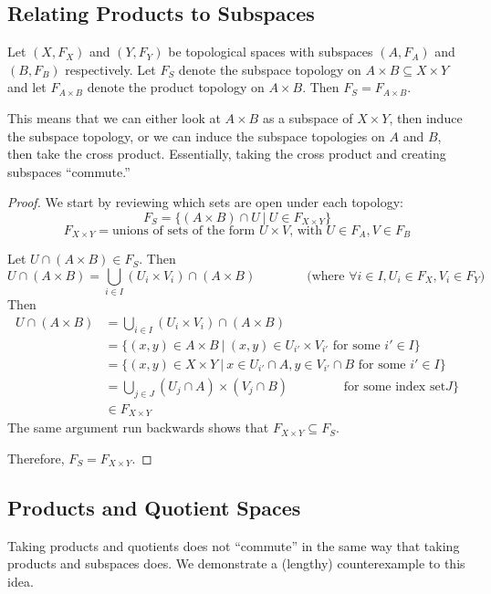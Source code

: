 \subsection{Relating Products to Subspaces}
\begin{smallfact}
Let $(X, F_X)$ and $(Y, F_Y)$ be topological spaces with subspaces $(A, F_A)$ and $(B, F_B)$ respectively.  Let $F_S$ denote the subspace topology on $A\times B\subseteq X\times Y$ and let $F_{A\times B}$ denote the product topology on $A\times B$.  Then $F_S = F_{A\times B}$.
\end{smallfact}
This means that we can either look at $A\times B$ as a subspace of $X\times Y$, then induce the subspace topology, or we can induce the subspace topologies on $A$ and $B$, then take the cross product.  Essentially, taking the cross product and creating subspaces ``commute.''
\begin{proof}
We start by reviewing which sets are open under each topology:
\[ F_S = \{  (A\times B)\cap U\ |\ U\in F_{X\times Y} \}\]
\[ F_{X\times Y} = \text{unions of sets of the form } U\times V\text{, with } U\in F_A, V\in F_B \]

Let $U\cap(A\times B)\in F_S$.  Then
\[  U\cap(A\times B) = \bigcup_{i\in I} (U_i\times V_i)\cap (A\times B) \qquad\qquad\text{(where }\forall i\in I, U_i\in F_X, V_i\in F_Y)\]
Then 
\begin{align*}
U\cap(A\times B) &= \bigcup_{i\in I} (U_i\times V_i)\cap (A\times B)\\
&= \{ (x,y)\in A\times B\ |\ (x,y)\in U_{i'}\times V_{i'}\text{ for some }i'\in I \} \\
&= \{ (x,y)\in X\times Y\ |\ x\in U_{i'}\cap A, y\in V_{i'}\cap B\text{ for some }i'\in I\} \\
&= \bigcup_{j\in J} (U_j\cap A)\times (V_j\cap B)\qquad\qquad\text{ for some index set} J \}\\
&\in F_{X\times Y}
\end{align*}
The same argument run backwards shows that $F_{X\times Y}\subseteq F_S$.

Therefore, $F_{S} = F_{X\times Y}$.
\end{proof}

\subsection{Products and Quotient Spaces}
Taking products and quotients does not ``commute'' in the same way that taking products and subspaces does.  We demonstrate a (lengthy) counterexample to this idea.


